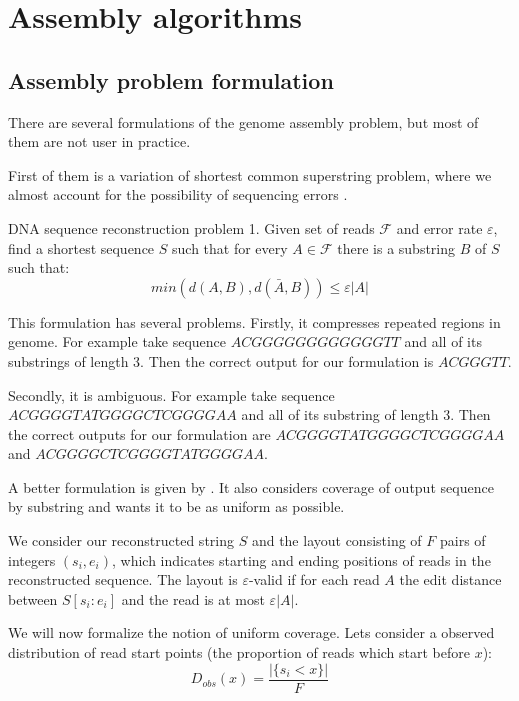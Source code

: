 \chapter{Assembly algorithms}

\section{Assembly problem formulation}

There are several formulations of the genome assembly problem, but
most of them are not user in practice.

First of them is a variation of shortest common superstring problem, where we
almost account for the possibility of sequencing errors \cite{kececioglu1995combinatorial}. 

\begin{definition}{DNA sequence reconstruction problem 1.}
Given set of reads $\mathcal{F}$ and error rate $\varepsilon$, find
a shortest sequence $S$ such that for every $A \in \mathcal{F}$ there is a substring
$B$ of $S$ such that:
$$min(d(A,B), d(\bar{A}, B)) \leq \varepsilon |A|$$
\end{definition}

This formulation has several problems. 
Firstly, it compresses repeated regions in genome. For example take sequence
$ACGGGGGGGGGGGGTT$ and all of its substrings of length 3. Then the correct
output for our formulation is $ACGGGTT$.

Secondly, it is ambiguous. For example take sequence
$ACGGGGTATGGGGCTCGGGGAA$ and all of its substring of length 3. Then the correct
outputs for our formulation are $ACGGGGTATGGGGCTCGGGGAA$ and
$ACGGGGCTCGGGGTATGGGGAA$.

A better formulation is given by \cite{myers1995toward}. It also considers
coverage of output sequence by substring and wants it to be as uniform as possible.

We consider our reconstructed string $S$ and the layout consisting of
$F$ pairs of integers $(s_i, e_i)$, which indicates starting and ending positions
of reads in the reconstructed sequence. The layout is $\varepsilon$-valid
if for each read $A$ the edit distance between $S[s_i:e_i]$ and the read
is at most $\varepsilon |A|$.

We will now formalize the notion of uniform coverage. Lets consider a observed
distribution of read start points (the proportion of reads which start before $x$):
$$D_{obs}(x) = \frac{|\{s_i < x\}|}{F}$$

